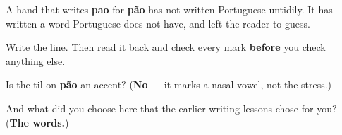A hand that writes \textbf{pao} for \textbf{pão} has not written Portuguese untidily. It has written a word Portuguese does not have, and left the reader to guess.

Write the line. Then read it back and check every mark \textbf{before} you check anything else.

\begin{tcolorbox}[breakable,colback=teal!4,colframe=teal!35!black,title={Before you move on}]
Is the til on \textbf{pão} an accent? (\textbf{No} — it marks a nasal vowel, not the stress.)

And what did you choose here that the earlier writing lessons chose for you? (\textbf{The words.})
\end{tcolorbox}
